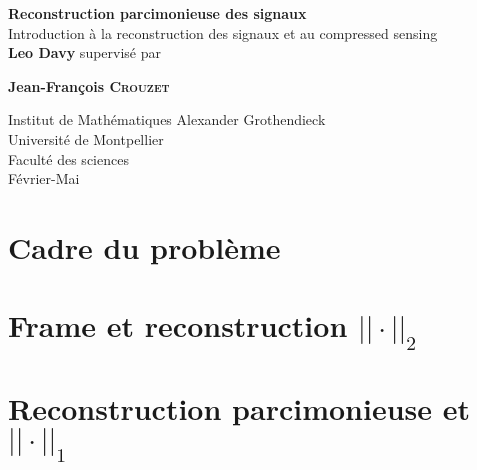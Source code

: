 \documentclass[12pt]{report}
\theoremstyle{plain}
\theoremstyle{remark}
\theoremstyle{definition}
\begin{document}
\renewcommand{\proofname}{Preuve}
\begin{titlepage}
	\begin{center}
		\vspace*{1cm}
		\huge
		\textbf{Reconstruction parcimonieuse des signaux\\}
		\vspace*{0.5cm}
	        \LARGE
		Introduction à la reconstruction des signaux et au compressed sensing\\ 
		\vspace{1.5cm}
		\textbf{Leo Davy}
		\vfill				      
	        supervisé par\par
		\textbf{Jean-François \textsc{Crouzet}}
							    
		\vspace{0.8cm}
		
		\Large					  
		Institut de Mathématiques Alexander Grothendieck\\
		Université de Montpellier\\
	        Faculté des sciences\\
	        Février-Mai
				      
	\end{center}
\end{titlepage}


\tableofcontents{}

\chapter{Cadre du problème}


\chapter{Frame et reconstruction $||\cdot||_2$}


\chapter{Reconstruction parcimonieuse et $||\cdot||_1$}

\end{document}
